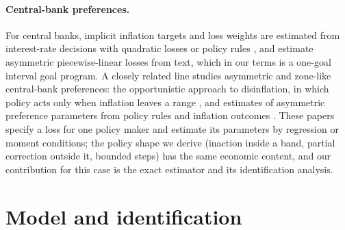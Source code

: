 \documentclass[pdflatex,sn-basic]{sn-jnl}
\theoremstyle{thmstyleone}\newtheorem{proposition}{Proposition}\newtheorem{theorem}{Theorem}
\theoremstyle{thmstylethree}\newtheorem{remark}{Remark}
\begin{document}
\paragraph{Central-bank preferences.} For central banks, implicit inflation targets and loss weights are estimated from interest-rate decisions with quadratic losses or policy rules \citep{taylor1993,clarida2000,svensson1997,dennis2006,favero2003,ozlale2003,ireland2007}, and \citet{shapiro2021} estimate asymmetric piecewise-linear losses from text, which in our terms is a one-goal interval goal program. A closely related line studies asymmetric and zone-like central-bank preferences: the opportunistic approach to disinflation, in which policy acts only when inflation leaves a range \citep{orphanides2002}, and estimates of asymmetric preference parameters from policy rules and inflation outcomes \citep{rugemurcia2003,surico2007,kilian2008}. These papers specify a loss for one policy maker and estimate its parameters by regression or moment conditions; the policy shape we derive (inaction inside a band, partial correction outside it, bounded steps) has the same economic content, and our contribution for this case is the exact estimator and its identification analysis.

\section{Model and identification}\label{sec:modelident}
\end{document}
